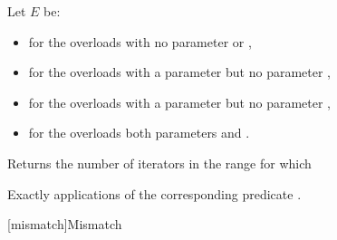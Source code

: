\begin{itemdescr}
{\color{newclr}
\pnum
Let $E$ be:
\begin{itemize}
\item {} for the overloads with no parameter  or ,
\item {} for the overloads with a parameter  but no parameter ,
\item {} for the overloads with a parameter  but no parameter ,
\item {} for the overloads both parameters  and .
\end{itemize}
} %

\pnum
\effects
Returns the number of iterators
in the range 
for which  

\pnum
\complexity
Exactly
applications of the corresponding predicate .
\end{itemdescr}

[mismatch]{Mismatch}


